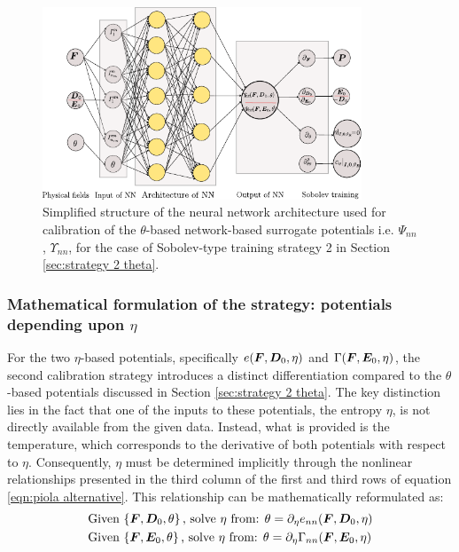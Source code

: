 \begin{figure}[htpb!]
	\centering
	\includegraphics[width=0.85\textwidth]{Figures/InkScape/NN_2}
	\vspace{-2mm}
	\caption{Simplified structure of the neural network architecture used for calibration of the $\theta$-based network-based surrogate potentials i.e. $\Psi_{nn}$, $\Upsilon_{nn}$, for the case of Sobolev-type training strategy 2 in Section \ref{sec:strategy 2 theta}.}
	\label{fig:strategy 2}
\end{figure}




\newpage

\subsubsection{Mathematical formulation of the strategy: potentials depending upon $\eta$}\label{sec:strategy 2 eta}


For the two $\eta$-based potentials, specifically $e(\boldsymbol{F}, \boldsymbol{D}_0, \eta)$ and $\Gamma(\boldsymbol{F}, \boldsymbol{E}_0, \eta)$, the second calibration strategy introduces a distinct differentiation compared to the $\theta$-based potentials discussed in Section \ref{sec:strategy 2 theta}. The key distinction lies in the fact that one of the inputs to these potentials, the entropy $\eta$, is not directly available from the given data. Instead, what is provided is the temperature, which corresponds to the derivative of both potentials with respect to $\eta$. Consequently, $\eta$ must be determined implicitly through the nonlinear relationships presented in the third column of the first and third rows of equation \eqref{eqn:piola alternative}. This relationship can be mathematically reformulated as:
%
\begin{equation}\label{eqn:thermo}
\begin{aligned}
&\text{Given } \{\vect{F},\vect{D}_0,\theta\}\, \text{, solve } \eta \text{ from:            }\theta   =  \partial_{\eta}e_{nn}(\vect{F},\vect{D}_0,\eta)\\
%
&\text{Given } \{\vect{F},\vect{E}_0,\theta\}\, \text{, solve } \eta \text{ from:            }\theta   =  \partial_{\eta}\Gamma_{nn}(\vect{F},\vect{E}_0,\eta)
\end{aligned}
\end{equation}




